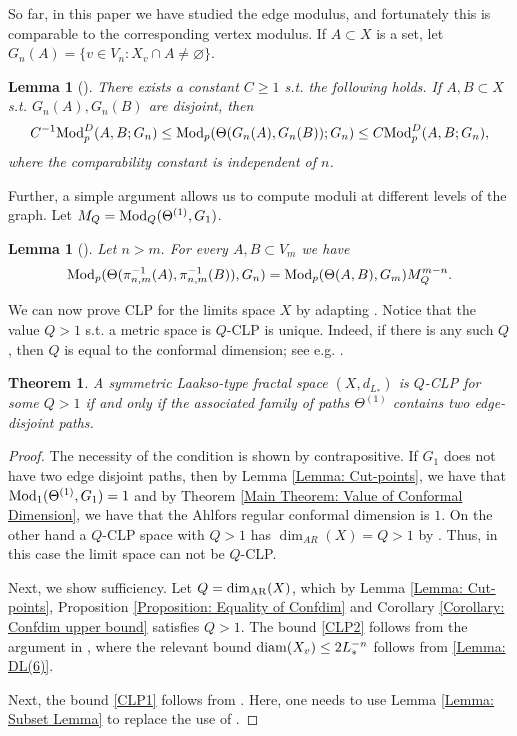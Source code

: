 \documentclass{amsart}
\newcommand{\diam}{{\rm diam}}
\newcommand{\Mod}{{\rm Mod}}
\newcommand{\AR}{{\rm AR}}
\newtheorem{theorem}[equation]{Theorem}
\newtheorem{lemma}[equation]{Lemma}
\numberwithin{equation}{section}
\theoremstyle{definition}
\theoremstyle{remark}
\begin{document}
So far, in this paper we have studied the edge modulus, and fortunately this is comparable to the corresponding vertex modulus. If $A \subset X$ is a set, let $G_n(A)=\{v\in V_n : X_v \cap A\neq \varnothing\}$. 
\begin{lemma}[{\cite[Proposition 5.4.9]{anttila2024constructions}}]\label{lem:dmodemod} There exists a constant $C\geq 1$ s.t. the following holds. If $A,B\subset X$ s.t. $G_n(A),G_n(B)$ are disjoint, then
    \[
    C^{-1}\Mod_p^D(A,B;G_n) \leq\Mod_p(\Theta(G_n(A),G_n(B));G_n) \leq C\Mod_p^D(A,B;G_n),
    \]
    where the comparability constant is independent of $n$.
\end{lemma}

Further, a simple argument allows us to compute moduli at different levels of the graph. Let $M_Q=\Mod_Q(\Theta^{(1)},G_1)$. 

\begin{lemma}
[{\cite[Theorem 4.38]{anttila2024constructions}}]
\label{lem:modulusbound} Let $n>m.$ For every $A,B\subset V_m$ we have
\[
\Mod_p(\Theta(\pi_{n,m}^{-1}(A),\pi_{n,m}^{-1}(B)), G_n) = \Mod_p(\Theta(A,B),G_m) M_Q^{m-n}.
\]
\end{lemma}

We can now prove CLP for the limits space $X$ by adapting \cite[Theorem 5.2]{anttila2024constructions}. Notice that the value $Q>1$ s.t. a metric space is $Q$-CLP is unique. Indeed, if there is any such $Q$, then $Q$ is equal to the conformal dimension; see e.g. \cite[Lemma 4.2]{EBConf}. 

\begin{theorem}\label{thm:CLP} 
A symmetric Laakso-type fractal space \((X,d_{L_*})\) is \(Q\)-CLP for some \(Q>1\) if and only if the associated family of paths \(\Theta^{(1)}\) contains two edge-disjoint paths.
\end{theorem}

\begin{proof}

The necessity of the condition is shown by contrapositive. 
If $G_1$ does not have two edge disjoint paths, then by Lemma \ref{Lemma: Cut-points}, we have that $\Mod_1(\Theta^{(1)},G_1)=1$ and by Theorem \ref{Main Theorem: Value of Conformal Dimension}, we have that the Ahlfors regular conformal dimension is $1$. On the other hand a $Q$-CLP space with $Q>1$ has $\dim_{AR}(X)=Q>1$ by \cite[Lemma 4.2]{EBConf}. Thus, in this case the limit space can not be $Q$-CLP.

Next, we show sufficiency. Let $Q=\dim_{\AR}(X)$, which by Lemma \ref{Lemma: Cut-points}, Proposition \ref{Proposition: Equality of Confdim} and Corollary \ref{Corollary: Confdim upper bound} satisfies $Q>1$. The bound \ref{CLP2} follows from the argument in \cite[Proposition 5.2]{anttila2024constructions}, where the relevant bound $\diam(X_v)\leq 2L_*^{-n}$ follows from \ref{Lemma: DL(6)}.

Next, the bound \ref{CLP1} follows from \cite[Proposition 5.7]{anttila2024constructions}. Here, one needs to use Lemma \ref{Lemma: Subset Lemma} to replace the use of \cite[Proposition 3.37]{anttila2024constructions}.
\end{proof}
\end{document}
